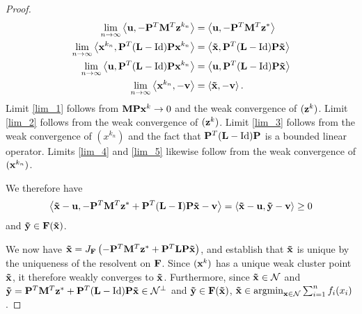 \begin{proof}
\begin{align}
    \lim_{n \to \infty} \left\langle \mathbf{u}, -\mathbf{P}^T \mathbf{M}^T \mathbf{z}^{k_n} \right\rangle &= \left\langle \mathbf{u}, -\mathbf{P}^T \mathbf{M}^T \mathbf{z}^* \right\rangle \label{lim_2}\\
    \lim_{n \to \infty} \left\langle \mathbf{x}^{k_n} , \mathbf{P}^T (\mathbf{L} - \mathrm{Id}) \mathbf{P} \mathbf{x}^{k_n} \right\rangle &= \left\langle \mathbf{\tilde{x}} , \mathbf{P}^T (\mathbf{L} - \mathrm{Id}) \mathbf{P} \mathbf{\tilde{x}} \right\rangle \label{lim_3}\\
    \lim_{n \to \infty} \left\langle \mathbf{u} , \mathbf{P}^T (\mathbf{L} - \mathrm{Id}) \mathbf{P} \mathbf{x}^{k_n} \right\rangle &= \left\langle \mathbf{u} , \mathbf{P}^T (\mathbf{L} - \mathrm{Id}) \mathbf{P} \mathbf{\tilde{x}} \right\rangle \label{lim_4}\\
    \lim_{n \to \infty}  \left\langle \mathbf{x}^{k_n} , -\mathbf{v} \right\rangle &= \left\langle \mathbf{\tilde{x}} , -\mathbf{v} \right\rangle. \label{lim_5}
\end{align}
Limit \eqref{lim_1} follows from $\mathbf{M}\mathbf{P}\mathbf{x}^k \to 0$ and the weak convergence of $(\mathbf{z}^k)$.
Limit \eqref{lim_2} follows from the weak convergence of $(\mathbf{z}^k)$.
Limit \eqref{lim_3} follows from the weak convergence of $(x^{k_n})$ and the fact that $\mathbf{P}^T(\mathbf{L} - \mathrm{Id})\mathbf{P}$ is a bounded linear operator.
Limits \eqref{lim_4} and \eqref{lim_5} likewise follow from the weak convergence of $(\mathbf{x}^{k_n})$.

We therefore have 
\[ \left\langle \mathbf{\tilde{x}} - \mathbf{u}, -\mathbf{P}^T\mathbf{M}^T\mathbf{z}^* + \mathbf{P}^T(\mathbf{L} - \mathbf{I})\mathbf{P}\mathbf{\tilde{x}} - \mathbf{v} \right\rangle = \left\langle \mathbf{\tilde{x}} - \mathbf{u}, \mathbf{\tilde{y} - \mathbf{v}} \right\rangle \geq 0
\]
and $\mathbf{\tilde{y}} \in \mathbf{F}(\mathbf{\tilde{x}})$.

We now have $\mathbf{\tilde{x}} = J_{\mathbf{F}}\left(-\mathbf{P}^T\mathbf{M}^T\mathbf{z}^* + \mathbf{P}^T\mathbf{L}\mathbf{P}\mathbf{\tilde{x}}\right)$, and establish that $\mathbf{\tilde{x}}$ is unique by the uniqueness of the resolvent on $\mathbf{F}$.
Since $(\mathbf{x}^k)$ has a unique weak cluster point $\mathbf{\tilde{x}}$, it therefore weakly converges to $\mathbf{\tilde{x}}$.
Furthermore, since $\mathbf{\tilde{x}} \in \mathcal{N}$ and $\mathbf{\tilde{y}} = \mathbf{P}^T \mathbf{M}^T \mathbf{z}^* + \mathbf{P}^T(\mathbf{L} - \mathrm{Id})\mathbf{P}\mathbf{\tilde{x}} \in \mathcal{N}^\perp$ and $\mathbf{\tilde{y}} \in \mathbf{F}(\mathbf{\tilde{x}})$, $\mathbf{\tilde{x}} \in \operatorname*{argmin}_{\mathbf{x} \in \mathcal{N}} \sum_{i=1}^n f_i(x_i)$.
\end{proof}